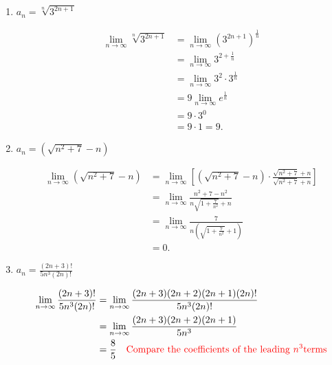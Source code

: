 \documentclass[noinstructornotes]{ximera}
\begin{document}
\begin{problem}
\begin{enumerate}
	
	
	\item  $a_n = \sqrt[n]{3^{2n+1}}$
	\begin{freeResponse}
		\begin{align*}
		\lim_{n \to \infty} \sqrt[n]{3^{2n+1}}
		&= \lim_{n \to \infty} \left( 3^{2n+1} \right)^{\frac{1}{n}}  \\
		&= \lim_{n \to \infty} 3^{2 + \frac{1}{n}}  \\
		&= \lim_{n \to \infty} 3^2 \cdot 3^{\frac{1}{n}}  \\
		&= 9 \lim_{n \to \infty} e^{\frac{1}{n}}  \\
		&= 9 \cdot 3^0  \\
		&= 9 \cdot 1 = 9.
		\end{align*}
	\end{freeResponse}
	
	
	
	\item  $a_n = \left( \sqrt{n^2+7} - n \right)$
	\begin{freeResponse}
		\begin{align*}
		\lim_{n \to \infty} \left( \sqrt{n^2+7} - n \right)
		&= \lim_{n \to \infty} \left[ \left( \sqrt{n^2 + 7} - n \right) \cdot \frac{\sqrt{n^2 + 7} + n}{\sqrt{n^2 + 7} + n} \right]  \\
		&= \lim_{n \to \infty} \frac{n^2 + 7 - n^2}{n \sqrt{1 + \frac{7}{n^2}} + n}  \\
		&= \lim_{n \to \infty} \frac{7}{n ( \sqrt{1 + \frac{7}{n^2}} + 1)}  \\
		&= 0.
		\end{align*}
	\end{freeResponse}
	
	
	
	\item  $a_n = \frac{(2n+3)!}{5n^3 (2n)!}$
	\begin{freeResponse}
		\begin{align*}
		\lim_{n \to \infty} \frac{(2n+3)!}{5n^3(2n)!}
		&= \lim_{n \to \infty} \frac{(2n+3)(2n+2)(2n+1)(2n)!}{5n^3(2n)!}  \\
		&= \lim_{n \to \infty} \frac{(2n+3)(2n+2)(2n+1)}{5n^3}  \\
		&= \frac{8}{5} 	\quad	{\color{red}\text{Compare the coefficients of the leading }n^3 \text{terms}}
		\end{align*}
	\end{freeResponse}
	
	
	

\end{enumerate}
\end{problem}
\end{document}
